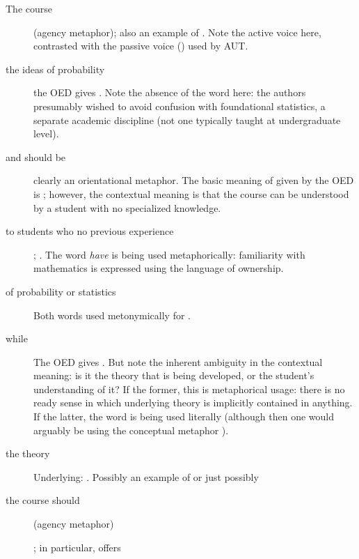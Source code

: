 \begin{description}
\item[The course ]\qquad (agency metaphor);
  also an example of .  Note the active
  voice here, contrasted with the passive voice () used by AUT.
\item[the  ideas of probability]\qquad the OED
  gives .  Note the absence of the word
   here: the authors presumably wished to avoid
  confusion with foundational statistics, a separate academic
  discipline (not one typically taught at undergraduate level).
\item[and should be ]\qquad clearly an
  orientational metaphor.  The basic meaning of 
  given by the OED is ; however,
  the contextual meaning is that the course can be understood by a
  student with no specialized knowledge.
\item[to students who  no previous
  experience]\qquad{}; .  The word \emph{have} is being used
  metaphorically: familiarity with mathematics is expressed using the
  language of ownership.
\item[of probability or statistics]\qquad Both words used
  metonymically for .
\item[while ]\qquad The OED gives .  But note the inherent
  ambiguity in the contextual meaning: is it the theory that is being
  developed, or the student's understanding of it?  If the former,
  this is metaphorical usage: there is no ready sense in which
  underlying theory is implicitly contained in anything.  If the
  latter, the word is being used literally (although then one would
  arguably be using the conceptual metaphor ).
\item[the  theory]\qquad Underlying:
  .  Possibly an example of
   or just possibly 
\item[the course should]\qquad (agency metaphor)
\item[]\qquad{}; in particular,  offers

\end{description}
